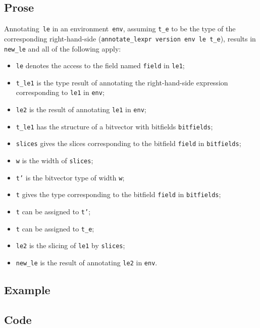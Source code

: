 \documentclass{book}
\begin{document}
    \subsection{Prose}
   Annotating~\texttt{le} in an environment~\texttt{env}, assuming
\texttt{t\_e} to be the type of the corresponding right-hand-side
(\texttt{annotate\_lexpr version env le t\_e}), results in \texttt{new\_le} and
all of the following apply:
   \begin{itemize}
   \item \texttt{le} denotes the access to the field named \texttt{field} in \texttt{le1};
   \item \texttt{t\_le1} is the type result of annotating the right-hand-side expression corresponding to \texttt{le1} in \texttt{env};
   \item \texttt{le2} is the result of annotating \texttt{le1} in \texttt{env};
   \item \texttt{t\_le1} has the structure of a bitvector with bitfields \texttt{bitfields};
   \item \texttt{slices} gives the slices corresponding to the bitfield \texttt{field} in
      \texttt{bitfields};
   \item \texttt{w} is the width of \texttt{slices};
   \item \texttt{t'} is the bitvector type of width \texttt{w};
   \item \texttt{t} gives the type corresponding to the bitfield \texttt{field} in
      \texttt{bitfields};
   \item \texttt{t} can be assigned to \texttt{t'};
   \item \texttt{t} can be assigned to \texttt{t\_e};
   \item \texttt{le2} is the slicing of \texttt{le1} by \texttt{slices};
   \item \texttt{new\_le} is the result of annotating \texttt{le2} in \texttt{env}.
   \end{itemize}

  \subsection{Example}

  \subsection{Code}
\end{document}
